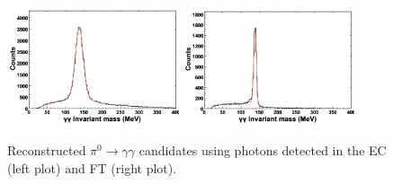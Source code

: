 \begin{figure}
\centering
\includegraphics[width=0.45\textwidth]{pics/ecal_pi0.png}
\includegraphics[width=0.45\textwidth]{pics/ft_pi0.png}
\caption{Reconstructed $\pi^{0}\rightarrow \gamma \gamma$ candidates using photons detected in the EC (left plot) and FT (right plot).}
\label{fig:pi0mass}
\end{figure}

